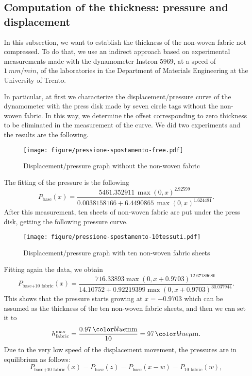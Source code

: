 \subsection{Computation of the thickness: pressure and displacement}
\label{subsec:YvsF}
In this subsection, we want to establish the thickness of the non-woven fabric not compressed. To do that, we use an indirect approach based on experimental measurements made with the dynamometer Instron 5969, at a speed of $1\ \unit{mm}/\unit{min}$, of the laboratories in the Department of Materials Engineering at the University of Trento.
\par 
In particular, at first we characterize the displacement/pressure curve of the dynamometer with the press disk made by seven circle tags without the non-woven fabric. In this way, we determine the offset corresponding to zero thickness to be eliminated in the measurement of the curve. We did two experiments and the results are the following.
\begin{figure}[H]
  \begin{center}
    \texttt{[image: figure/pressione-spostamento-free.pdf]}
  \end{center}
  \caption{Displacement/pressure graph without the non-woven fabric}
\end{figure}
The fitting of the pressure is the following
\[
  P_{\textrm{base}}(x) =
  \dfrac{5461.352911\,\max(0,x)^{2.92599}}
  {0.0038158166 + 6.4490865\,\max(0,x)^{1.624481}}.
\]
After this measurement, ten sheets of non-woven fabric are put under the press disk, getting the following pressure curve.
\begin{figure}[H]
  \begin{center}
    \texttt{[image: figure/pressione-spostamento-10tessuti.pdf]}
  \end{center}
  \caption{Displacement/pressure graph with ten non-woven fabric sheets}
\end{figure}
Fitting again the data, we obtain
\[
  P_{\textrm{base}+\textrm{10 fabric}}(x) =
  \dfrac{716.33893 \max(0,x+0.9703)^{12.67189680}}
        {14.10752 + 0.92219399\max(0,x+0.9703)^{30.037944}}.
\]
This shows that the pressure starts growing at $x=-0.9703$ which can be assumed as the thickness of the ten non-woven fabric sheets, and then we can set it to
\[
   \htissuemax = \dfrac{0.97\,\unit{mm}}{10} = 97\,\unit{$\mu$m}.
\]
Due to the very low speed of the displacement movement, the pressures are in equilibrium as follows:
\[
  P_{\textrm{base}+\textrm{10 fabric}}(x) =
  P_{\textrm{base}}(z) = P_{\textrm{base}}( x- w) =
  P_{\textrm{10 fabric}}(w),
\]
